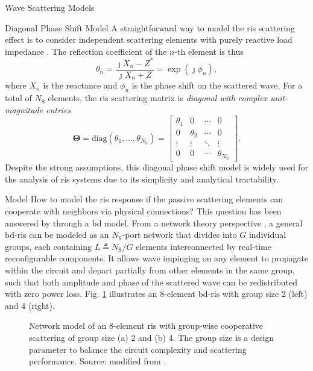 \begin{section}{}
\begin{subsection}{Wave Scattering Models}
		\begin{subsubsection}{Diagonal Phase Shift Model}
			A straightforward way to model the \gls{ris} scattering effect is to consider independent scattering elements with purely reactive load impedance \cite{Wu2018}.
			The reflection coefficient of the $n$-th element is thus
			\begin{equation}
				\theta_n = \frac{\jmath X_n - Z^*}{\jmath X_n + Z} = \exp(\jmath \phi_n),
				\label{eq:reflection_coefficient_ris}
			\end{equation}
			where $X_n$ is the reactance and $\phi_n$ is the phase shift on the scattered wave.
			For a total of $N_\mathrm{S}$ elements, the \gls{ris} scattering matrix is \emph{diagonal with complex unit-magnitude entries}
			\begin{equation}
				\mathbf{\Theta} = \mathrm{diag}(\theta_1, \ldots, \theta_{N_\mathrm{S}}) =
				\begin{bmatrix}
					\theta_1 & 0 & \cdots & 0 \\
					0 & \theta_2 & \cdots & 0 \\
					\vdots & \vdots & \ddots & \vdots \\
					0 & 0 & \cdots & \theta_{N_\mathrm{S}}
				\end{bmatrix}.
				\label{eq:diagonal_scattering_matrix}
			\end{equation}
			Despite the strong assumptions, this diagonal phase shift model is widely used for the analysis of \gls{ris} systems due to its simplicity and analytical tractability.
		\end{subsubsection}

		\begin{subsubsection}{ Model}
			How to model the \gls{ris} response if the passive scattering elements can cooperate with neighbors via physical connections?
			This question has been answered by \cite{Shen2020a} through a \gls{bd} model.
			From a network theory perspective \cite{Ivrlac2010}, a general \gls{bd}-\gls{ris} can be modeled as an $N_\mathrm{S}$-port network that divides into $G$ individual groups, each containing $L \triangleq N_\mathrm{S} / G$ elements interconnected by real-time reconfigurable components.
			It allows wave impinging on any element to propagate within the circuit and depart partially from other elements in the same group, such that both amplitude and phase of the scattered wave can be redistributed with zero power loss.
			Fig. \ref{fg:bd_ris_architecture_2} illustrates an 8-element \gls{bd}-\gls{ris} with group size 2 (left) and 4 (right).
			\begin{figure}[H]
				\centering
				\caption{Network model of an 8-element \gls{ris} with group-wise cooperative scattering of group size (a) 2 and (b) 4. The group size is a design parameter to balance the circuit complexity and scattering performance. Source: modified from \cite{Shen2020a}.}
				\label{fg:bd_ris_architecture_2}
			\end{figure}


\end{subsubsection}
\end{subsection}
\end{section}
